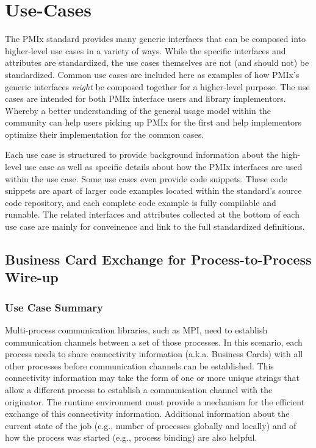 \chapter{Use-Cases}
\label{app:use-cases}

The \ac{PMIx} standard provides many generic interfaces that can be composed into higher-level use cases in a variety of ways.  While the specific interfaces and attributes are standardized, the use cases themselves are not (and should not) be standardized.  Common use cases are included here as examples of how PMIx's generic interfaces \textit{might} be composed together for a higher-level purpose. The use cases are intended for both \ac{PMIx} interface users and library implementors.  Whereby a better understanding of the general usage model within the community can help users picking up PMIx for the first and help implementors optimize their implementation for the common cases.

Each use case is structured to provide background information about the high-level use case as well as specific details about how the PMIx interfaces are used within the use case.  Some use cases even provide code snippets.  These code snippets are apart of larger code examples located within the standard's source code repository, and each complete code example is fully compilable and runnable. The related interfaces and attributes collected at the bottom of each use case are mainly for conveinence and link to the full standardized definitions.

\section {Business Card Exchange for Process-to-Process Wire-up}
\label{app:uc-business-card-exchange}

\subsection{Use Case Summary}

Multi-process communication libraries, such as MPI, need to establish communication channels between a set of those processes. In this scenario, each process needs to share connectivity information (a.k.a. Business Cards) with all other processes before communication channels can be established. This connectivity information may take the form of one or more unique strings that allow a different process to establish a communication channel with the originator. The runtime environment must provide a mechanism for the efficient exchange of this connectivity information. Additional information about the current state of the job (e.g., number of processes globally and locally) and of how the process was started (e.g., process binding) are also helpful.

